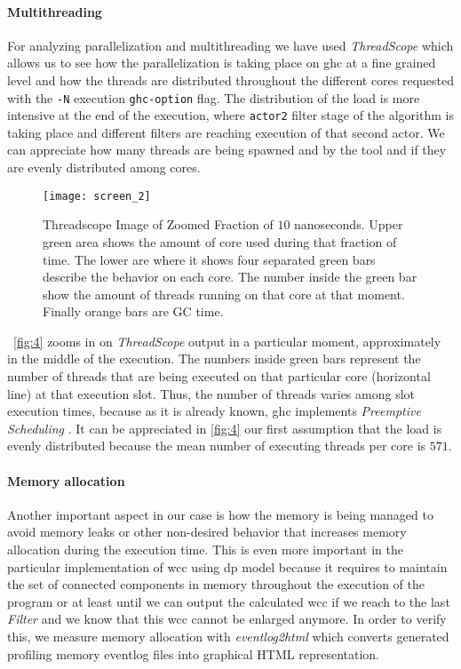 \paragraph{Multithreading} For analyzing parallelization and multithreading we have used \textit{ThreadScope} \cite{threadscope} which allows us to see how the parallelization is taking place on \acrshort{ghc} at a fine grained level and how the threads are distributed throughout the different cores requested with the \texttt{-N} execution \texttt{ghc-option} flag.
The distribution of the load is more intensive at the end of the execution, where \texttt{actor2} filter stage of the algorithm is taking place and different filters are reaching execution of that second actor.
We can appreciate how many threads are being spawned and by the tool and if they are evenly distributed among cores. 

\begin{figure}[!htb]
  \centering
  \texttt{[image: screen\_2]}
  \caption[{[PoC] Thread Metrics: Fraction of Time}]{Threadscope Image of Zoomed Fraction of $10$ nanoseconds. Upper green area shows the amount of core used during that fraction of time. The lower are where it shows four separated green bars describe the behavior on each core. The number inside the green bar show the amount of threads running on that core at that moment. Finally orange bars are GC time.}
  \label{fig:4}
 \end{figure}

~\autoref{fig:4} zooms in on \textit{ThreadScope} output in a particular moment, approximately in the middle of the execution. 
The numbers inside green bars represent the number of threads that are being executed on that particular core (horizontal line) at that execution slot. 
Thus, the number of threads varies among slot execution times, because as it is already known, \acrshort{ghc} implements \emph{Preemptive Scheduling} \cite{lightweightghc}.
It can be appreciated in \autoref{fig:4} our first assumption that the load is evenly distributed because the mean number of executing threads per core is $571$.


\paragraph{Memory allocation} Another important aspect in our case is how the memory is being managed to avoid memory leaks or other non-desired behavior that increases memory allocation during the execution time. 
This is even more important in the particular implementation of \acrshort{wcc} using \acrshort{dp} model because it requires to maintain the set of connected components in memory throughout the execution of the program or at least until we can output the calculated \acrshort{wcc} if we reach to the last \textit{Filter} and we know that this \acrshort{wcc} cannot be enlarged anymore.
In order to verify this, we measure memory allocation with \textit{eventlog2html} \cite{eventlog2html} which converts generated profiling memory eventlog files into graphical HTML representation. 

